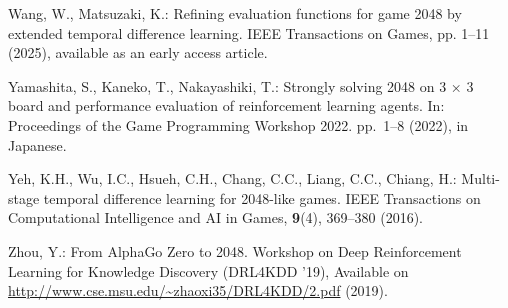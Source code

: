 \begin{thebibliography}{10}
Wang, W., Matsuzaki, K.: Refining evaluation functions for game 2048 by
  extended temporal difference learning. IEEE Transactions on Games, pp. 1--11
  (2025), available as an early access article.

Yamashita, S., Kaneko, T., Nakayashiki, T.: Strongly solving 2048 on 3 × 3
  board and performance evaluation of reinforcement learning agents. In:
  Proceedings of the Game Programming Workshop 2022. pp.~1--8 (2022), in
  Japanese.

Yeh, K.H., Wu, I.C., Hsueh, C.H., Chang, C.C., Liang, C.C., Chiang, H.:
  Multi-stage temporal difference learning for 2048-like games. IEEE
  Transactions on Computational Intelligence and AI in Games, \textbf{9}(4),
  369--380 (2016).

Zhou, Y.: From {AlphaGo} Zero to 2048. Workshop on Deep Reinforcement Learning
  for Knowledge Discovery (DRL4KDD '19), Available on
  \url{http://www.cse.msu.edu/~zhaoxi35/DRL4KDD/2.pdf} (2019).

\end{thebibliography}
